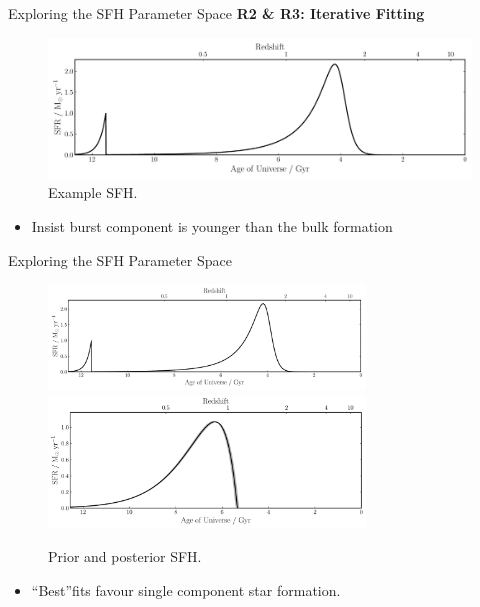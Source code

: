 \documentclass{beamer}
\begin{document}
\begin{frame}{Exploring the SFH Parameter Space}
  \textbf{R2 \& R3: Iterative Fitting}
  \begin{figure}
    \centering
    \includegraphics[width=\textwidth]{../pipes/plots/r0_priors/phil_model_4_sfh}
    \caption{Example SFH.}
  \end{figure}
  \begin{itemize}
    \item Insist burst component is younger than the bulk formation
  \end{itemize}
\end{frame}

\begin{frame}{Exploring the SFH Parameter Space}
  \begin{figure}
    \centering
    \includegraphics[width=0.75\textwidth]{../pipes/plots/r0_priors/phil_model_4_sfh}
    \includegraphics[width=0.75\textwidth]{../pipes/plots/r2_delayed_burst_wide/phil_model_4_sfh}
    \caption{Prior and posterior SFH.}
  \end{figure}
  \begin{itemize}
    \item ``Best''fits favour single component star formation.
  \end{itemize}
\end{frame}
\end{document}
